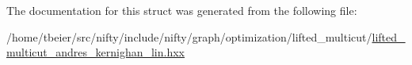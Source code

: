The documentation for this struct was generated from the following file\+:\begin{DoxyCompactItemize}
\item 
/home/tbeier/src/nifty/include/nifty/graph/optimization/lifted\+\_\+multicut/\hyperlink{lifted__multicut__andres__kernighan__lin_8hxx}{lifted\+\_\+multicut\+\_\+andres\+\_\+kernighan\+\_\+lin.\+hxx}\end{DoxyCompactItemize}
